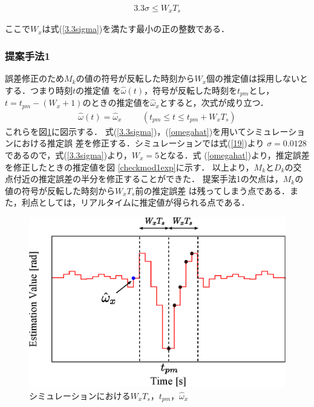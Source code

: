 \documentclass[a4paper,12pt]{jarticle}
\begin{document}
\begin{align}
 3.3\sigma \leq W_xT_s\label{3.3sigma}
\end{align}

ここで$W_x$は式(\ref{3.3sigma})を満たす最小の正の整数である．
\subsubsection{提案手法1}
誤差修正のため$M_k$の値の符号が反転した時刻から$W_x$個の推定値は採用しないとする．つまり時刻$t$の推定値
を$\hat{\omega}(t)$，符号が反転した時刻を$t_{pm}$とし，
$t=t_{pm}-(W_x+1)$のときの推定値を$\hat{\omega}_x$とすると，次式が成り立つ．
\begin{align}
 \hat{\omega}(t)=\hat{\omega}_x \hspace{1cm} ( t_{pm}\leq t \leq t_{pm}+W_xT_s )\label{omegahat}
\end{align}
これらを図\ref{checkexp}に図示する．
式(\ref{3.3sigma})，(\ref{omegahat})を用いてシミュレーションにおける推定誤
差を修正する．シミュレーションでは式(\ref{19})より
$\sigma=0.0128$であるので，式(\ref{3.3sigma})より，$W_x=5$となる．式
(\ref{omegahat})より，推定誤差を修正したときの推定値を図
\ref{checkmod1exp}に示す．
以上より，$M_k$と$D_k$の交点付近の推定誤差の半分を修正することができた．
提案手法1の欠点は，$M_k$の値の符号が反転した時刻から$W_xT_s$前の推定誤差
は残ってしまう点である．また，利点としては，リアルタイムに推定値が得られる点である．
\begin{figure}[htbp]
 \centering
 \includegraphics[scale=0.9]{checkzoomexp.eps}
  \hspace{105mm}
    \caption{シミュレーションにおける$W_xT_s$，$t_{pm}$，$\hat{\omega}_x$}
		\label{checkexp}
 \end{figure}
\end{document}
